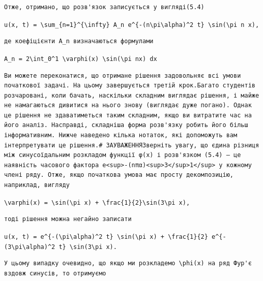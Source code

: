 \documentclass[
  ukrainian,
]{article}
\begin{document}
\begin{verbatim}
Отже, отримано, що розв'язок записується у вигляді(5.4)
\end{verbatim}

\texttt{u(x,\ t)\ =\ \textbackslash{}sum\_\{n=1\}\^{}\{\textbackslash{}infty\}\ A\_n\ e\^{}\{-(n\textbackslash{}pi\textbackslash{}alpha)\^{}2\ t\}\ \textbackslash{}sin(\textbackslash{}pi\ n\ x),}

\begin{verbatim}
де коефіцієнти A_n визначаються формулами
\end{verbatim}

\texttt{A\_n\ =\ 2\textbackslash{}int\_0\^{}1\ \textbackslash{}varphi(x)\ \textbackslash{}sin(\textbackslash{}pi\ nx)\ dx}

\begin{verbatim}
Ви можете переконатися, що отримане рішення задовольняє всі умови початкової задачі. На цьому завершується третій крок.Багато студентів розчаровані, коли бачать, наскільки складним виглядає рішення, і майже не намагаються дивитися на нього знову (виглядає дуже погано). Однак це рішення не здаватиметься таким складним, якщо ви витратите час на його аналіз. Насправді, складніша форма розв'язку робить його більш інформативним. Нижче наведено кілька нотаток, які допоможуть вам інтерпретувати це рішення.# ЗАУВАЖЕННЯЗверніть увагу, що єдина різниця між синусоїдальним розкладом функції φ(x) і розв'язком (5.4) — це наявність часового фактора e<sup>-(nπα)<sup>3</sup>1</sup> у кожному члені ряду. Отже, якщо початкова умова має просту декомпозицію, наприклад, вигляду
\end{verbatim}

\texttt{\textbackslash{}varphi(x)\ =\ \textbackslash{}sin(\textbackslash{}pi\ x)\ +\ \textbackslash{}frac\{1\}\{2\}\textbackslash{}sin(3\textbackslash{}pi\ x),}

\begin{verbatim}
тоді рішення можна негайно записати
\end{verbatim}

\texttt{u(x,\ t)\ =\ e\^{}\{-(\textbackslash{}pi\textbackslash{}alpha)\^{}2\ t\}\ \textbackslash{}sin(\textbackslash{}pi\ x)\ +\ \textbackslash{}frac\{1\}\{2\}\ e\^{}\{-(3\textbackslash{}pi\textbackslash{}alpha)\^{}2\ t\}\ \textbackslash{}sin(3\textbackslash{}pi\ x).}

\begin{verbatim}
У цьому випадку очевидно, що якщо ми розкладемо \phi(x) на ряд Фур'є вздовж синусів, то отримуємо
\end{verbatim}
\end{document}
